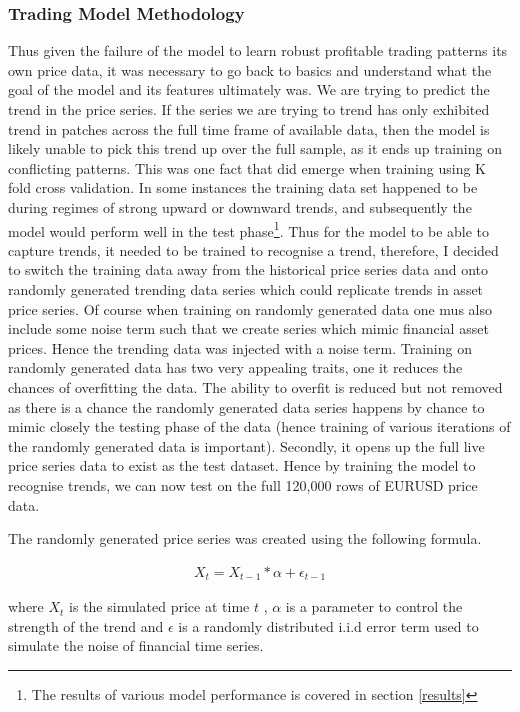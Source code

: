 \documentclass[11pt]{article}
\begin{document}
\subsubsection{Trading Model Methodology} \label{rand}
Thus given the failure of the model to learn robust profitable trading patterns its own price data, it was necessary to go back to basics and understand what the goal of the model and its features ultimately was. We are trying to predict the trend in the price series. If the series we are trying to trend has only exhibited trend in patches across the full time frame of available data, then the model is likely unable to pick this trend up over the full sample, as it ends up training on conflicting patterns. This was one fact that did emerge when training using K fold cross validation. In some instances the training data set happened to be during regimes of strong upward or downward trends, and subsequently the model would perform well in the test phase\footnote{The results of various model performance is covered in section \ref{results}}. Thus for the model to be able to capture trends, it needed to be trained to recognise a trend, therefore, I decided to switch the training data away from the historical price series data and onto randomly generated trending data series which could replicate trends in asset price series. Of course when training on randomly generated data one mus also include some noise term such that we create series which mimic financial asset prices. Hence the trending data was injected with a noise term.
Training on randomly generated data has two very appealing traits, one it reduces the chances of overfitting the data. The ability to overfit is reduced but not removed as there is a chance the randomly generated data series happens by chance to mimic closely the testing phase of the data (hence training of various iterations of the randomly generated data is important). Secondly, it opens up the full live price series data to exist as the test dataset. \newline Hence by training the model to recognise trends, we can now test on the full 120,000 rows of EURUSD price data. 

The randomly generated price series was created using the following formula.

\begin{align}
X_{t} = X_{t-1}*\alpha + \epsilon_{t-1} 
\end{align}

where $X_{t}$ is the simulated price at time $t$ , $\alpha$ is a parameter to control the strength of the trend and $\epsilon$ is a randomly distributed i.i.d error term used to simulate the noise of financial time series.
\end{document}
